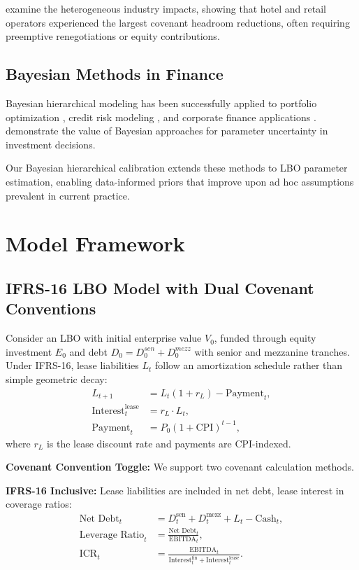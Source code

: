 \documentclass[11pt,a4paper]{article}
\numberwithin{equation}{section}
\theoremstyle{plain}
\theoremstyle{definition}
\begin{document}
\citet{lakshmanan2021lease} examine the heterogeneous industry impacts, showing that hotel and retail operators experienced the largest covenant headroom reductions, often requiring preemptive renegotiations or equity contributions.

\subsection{Bayesian Methods in Finance}

Bayesian hierarchical modeling has been successfully applied to portfolio optimization \citep{black1992global}, credit risk modeling \citep{kiefer2003default}, and corporate finance applications \citep{graham2015corporate}. \citet{pastor2000comparing} demonstrate the value of Bayesian approaches for parameter uncertainty in investment decisions.

Our Bayesian hierarchical calibration extends these methods to LBO parameter estimation, enabling data-informed priors that improve upon ad hoc assumptions prevalent in current practice.

\section{Model Framework}

\subsection{IFRS-16 LBO Model with Dual Covenant Conventions}

Consider an LBO with initial enterprise value $V_0$, funded through equity investment $E_0$ and debt $D_0 = D_0^{sen} + D_0^{mezz}$ with senior and mezzanine tranches. Under IFRS-16, lease liabilities $L_t$ follow an amortization schedule rather than simple geometric decay:
\begin{align}
L_{t+1} &= L_t(1 + r_L) - \text{Payment}_t, \\
\text{Interest}_t^{\text{lease}} &= r_L \cdot L_t, \\
\text{Payment}_t &= P_0(1 + \text{CPI})^{t-1},
\end{align}
where $r_L$ is the lease discount rate and payments are CPI-indexed.

\textbf{Covenant Convention Toggle:} We support two covenant calculation methods.

\textbf{IFRS-16 Inclusive:} Lease liabilities are included in net debt, lease interest in coverage ratios:
\begin{align}
\text{Net Debt}_t &= D_t^{\text{sen}} + D_t^{\text{mezz}} + L_t - \text{Cash}_t, \\
\text{Leverage Ratio}_t &= \frac{\text{Net Debt}_t}{\text{EBITDA}_t}, \\
\text{ICR}_t &= \frac{\text{EBITDA}_t}{\text{Interest}_t^{\text{fin}} + \text{Interest}_t^{\text{lease}}}.
\end{align}
\end{document}
